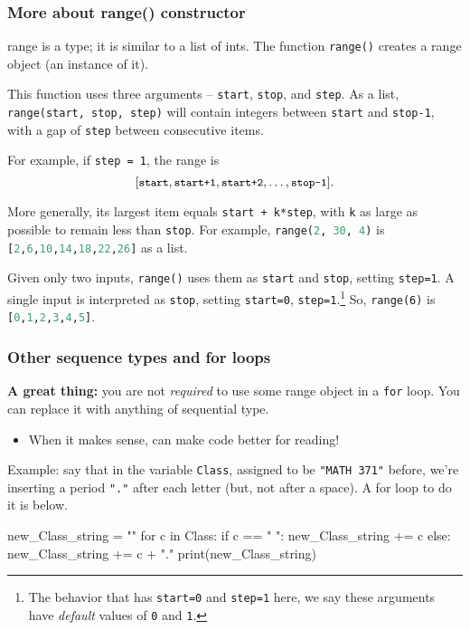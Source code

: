 \documentclass{beamer}
\newenvironment{codeblock}
    {\hfill\begin{beamerboxesrounded}[lower=codecol, width=0.8\textwidth]
    \medskip

    }
    { 
    \end{beamerboxesrounded}\hfill
    }
\theoremstyle{example}
\newcommand{\ct}[1]{\lstinline[language=Python]!#1!}
\newcommand{\ttt}[1]{{\small\texttt{#1}}}
\begin{document}
\begin{frame}[fragile]
\frametitle{More about {\ttm range()} constructor}
{\ttb range} is a type; it is similar to a list of ints. The function \ttt{range()} creates a range object (an instance of it). 

This function uses three arguments {--} \ttt{start}, \ttt{stop}, and \ttt{step}. %
As a list, \ttt{range(start, stop, step)} will contain integers between \ttt{start} and \ttt{stop-1}, with a gap of \ttt{step} between consecutive items. 

\pause
For example, if \ttt{step = 1}, the range is 
\[ [\ttt{start}, \ttt{start+1},\ttt{start+2},\ldots,\ttt{stop-1}]. \]

\pause
More generally, its largest item equals \ttt{start + k*step}, with \ttt{k} as large as possible to remain less than \ttt{stop}. For example, \ttt{range(}\ct{2, 30, 4}\ttt{)} is \ct{[2,6,10,14,18,22,26]} as a list.

\pause
Given only two inputs, \ttt{range()} uses them as \ttt{start} and \ttt{stop}, setting \ttt{step=1}. A single input is interpreted as \ttt{stop}, setting \ttt{start=0}, \ttt{step=1}.\footnote{The behavior that has \ttt{start=0} and \ttt{step=1} here, we say these arguments have \emph{default} values of \ttt{0} and \ttt{1}.} So, \ttt{range(6)} is \ct{[0,1,2,3,4,5]}.
\end{frame}

\begin{frame}[fragile]
\frametitle{Other sequence types and for loops}
\textbf{A great thing:} you are not \emph{required} to use some range object in a \ttt{for} loop. You can replace it with anything of sequential type. 
\begin{itemize}
	\item When it makes sense, can make code better for reading!
\end{itemize}

\vfill
\pause
Example: say that in the variable \ttt{Class}, assigned to be \ttt{"MATH 371"} before, we're inserting a period \ttt{"."} after each letter (but, not after a space). A for loop to do it is below.
\vspace*{12pt}

\begin{codeblock}

\begin{python}
new_Class_string = ""
for c in Class:
    if c == " ":
        new_Class_string += c
    else:
        new_Class_string += c + "."
print(new_Class_string)
\end{python}

\end{codeblock}
\end{frame}
\end{document}
